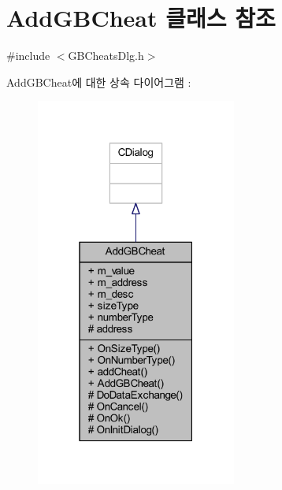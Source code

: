 \hypertarget{class_add_g_b_cheat}{}\section{Add\+G\+B\+Cheat 클래스 참조}
\label{class_add_g_b_cheat}


{\ttfamily \#include $<$G\+B\+Cheats\+Dlg.\+h$>$}



Add\+G\+B\+Cheat에 대한 상속 다이어그램 \+: \nopagebreak
\begin{figure}[H]
\begin{center}
\leavevmode
\includegraphics[width=187pt]{class_add_g_b_cheat__inherit__graph}
\end{center}
\end{figure}


